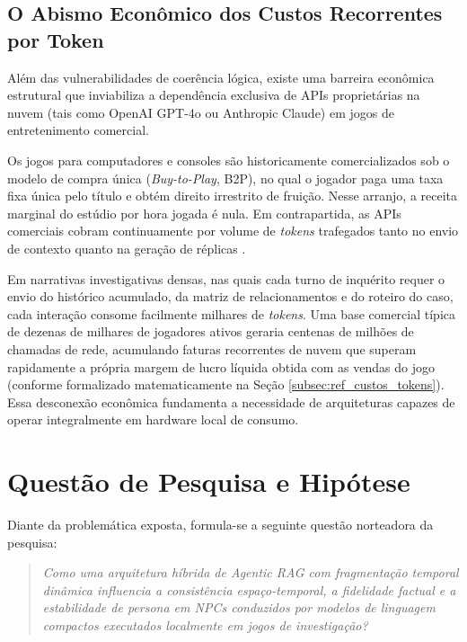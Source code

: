 \subsection{O Abismo Econômico dos Custos Recorrentes por Token}
\label{subsec:custo_tokens_problema}

Além das vulnerabilidades de coerência lógica, existe uma barreira econômica estrutural que inviabiliza a dependência exclusiva de APIs proprietárias na nuvem (tais como OpenAI GPT-4o ou Anthropic Claude) em jogos de entretenimento comercial.

Os jogos para computadores e consoles são historicamente comercializados sob o modelo de compra única (\textit{Buy-to-Play}, B2P), no qual o jogador paga uma taxa fixa única pelo título e obtém direito irrestrito de fruição. Nesse arranjo, a receita marginal do estúdio por hora jogada é nula. Em contrapartida, as APIs comerciais cobram continuamente por volume de \textit{tokens} trafegados tanto no envio de contexto quanto na geração de réplicas \cite{openai2024pricing}.

Em narrativas investigativas densas, nas quais cada turno de inquérito requer o envio do histórico acumulado, da matriz de relacionamentos e do roteiro do caso, cada interação consome facilmente milhares de \textit{tokens}. Uma base comercial típica de dezenas de milhares de jogadores ativos geraria centenas de milhões de chamadas de rede, acumulando faturas recorrentes de nuvem que superam rapidamente a própria margem de lucro líquida obtida com as vendas do jogo (conforme formalizado matematicamente na Seção \ref{subsec:ref_custos_tokens}). Essa desconexão econômica fundamenta a necessidade de arquiteturas capazes de operar integralmente em hardware local de consumo.

\section{Questão de Pesquisa e Hipótese}
\label{sec:questoes_pesquisa}

Diante da problemática exposta, formula-se a seguinte questão norteadora da pesquisa:

\begin{quote}
\small
\textit{Como uma arquitetura híbrida de Agentic RAG com fragmentação temporal dinâmica influencia a consistência espaço-temporal, a fidelidade factual e a estabilidade de persona em NPCs conduzidos por modelos de linguagem compactos executados localmente em jogos de investigação?}
\end{quote}


